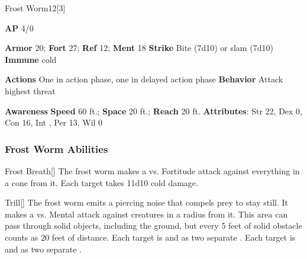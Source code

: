 \begin{monsection}{Frost Worm}{12}[3]
\vspace{-1em}\vspace{-1em}
\begin{spellcontent}
\begin{spelltargetinginfo}
{\textbf{AP} 4/0}

\pari \textbf{Armor} 20;
\textbf{Fort} 27;
\textbf{Ref} 12;
\textbf{Ment} 18
\pari \textbf{Strike} Bite  (7d10) or slam  (7d10)
\pari \textbf{Immune} cold

\pari \textbf{Actions} One in action phase, one in delayed action phase
\pari \textbf{Behavior} Attack highest threat
\end{spelltargetinginfo}
\end{spellcontent}

\begin{monsterfooter}
\pari \textbf{Awareness} 
\pari \textbf{Speed} 60 ft.;
\textbf{Space} 20 ft.;
\textbf{Reach} 20 ft.
\pari \textbf{Attributes}:
Str 22,
Dex 0,
Con 16,
Int ,
Per 13,
Wil 0
\end{monsterfooter}
\end{monsection}


\subsubsection{Frost Worm Abilities}

\begin{freeability}{Frost Breath}[]
The frost worm makes a  vs. Fortitude attack against everything in a \arealarge cone from it.
\hit Each target takes 11d10 cold damage.
\end{freeability}

\vspace{0.5em}
\begin{apability}{Trill}[]
The frost worm emits a piercing noise that compels prey to stay still.
It makes a  vs. Mental attack against creatures in a \areahuge radius from it.
This area can pass through solid objects, including the ground, but every 5 feet of solid obstacle counts as 20 feet of distance.
\hit Each target is  and  as two separate .
\crit Each target is  and  as two separate .
\end{apability}


